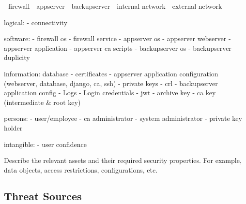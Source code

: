 \documentclass[english]{article}
\begin{document}
- firewall
- appserver
- backupserver
- internal network
- external network


logical:
- connectivity

software:
- firewall os
- firewall service
- appserver os
- appserver webserver
- appserver application
- appserver ca scripts
- backupserver os
- backupserver duplicity

information:
database
- certificates
- appserver application configuration (webserver, database, django, ca, ssh)
- private keys
- crl
- backupserver application config
- Logs
- Login credentials
- jwt
- archive key
- ca key (intermediate \& root key)


persons:
- user/employee
- ca administrator
- system administrator
- private key holder

intangible:
- user confidence

Describe the relevant assets and their required security
  properties. For example, data objects, access restrictions,
  configurations, etc.

\subsection{Threat Sources}
\end{document}
